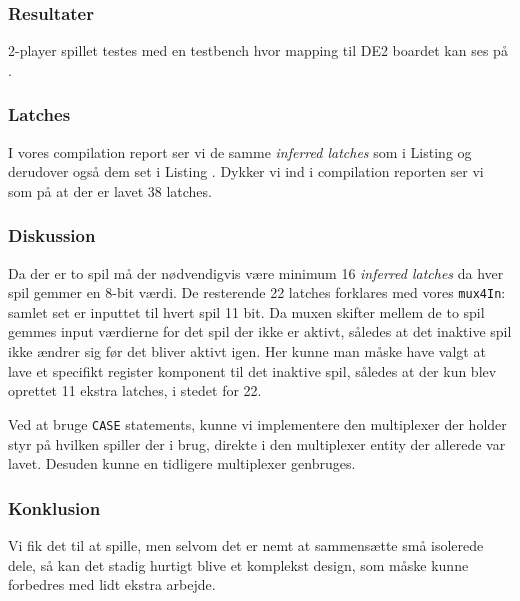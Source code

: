 {    

    \subsubsection{Resultater}

    2-player spillet testes med en testbench hvor mapping til DE2 boardet kan ses på .


    \subsubsection*{Latches}

    I vores compilation report ser vi de samme \emph{inferred latches} som i Listing  og derudover også dem set i Listing .
    Dykker vi ind i compilation reporten ser vi som på  at der er lavet 38 latches.



    \subsubsection{Diskussion}

    Da der er to spil må der nødvendigvis være minimum 16 \emph{inferred latches} da hver spil gemmer en 8-bit værdi.
    De resterende 22 latches forklares med vores \texttt{mux4In}: samlet set er inputtet til hvert spil 11 bit.
    Da muxen skifter mellem de to spil gemmes input værdierne for det spil der ikke er aktivt, således at det inaktive spil ikke ændrer sig før det bliver aktivt igen.
    Her kunne man måske have valgt at lave et specifikt register komponent til det inaktive spil, således at der kun blev oprettet 11 ekstra latches, i stedet for 22.

    Ved at bruge \texttt{CASE} statements, kunne vi implementere den multiplexer der holder styr på hvilken spiller der i brug, direkte i den multiplexer entity der allerede var lavet. Desuden kunne en tidligere multiplexer genbruges.

    \subsubsection{Konklusion}

    Vi fik det til at spille, men selvom det er nemt at sammensætte små isolerede dele, så kan det stadig hurtigt blive et komplekst design, som måske kunne forbedres med lidt ekstra arbejde.
}